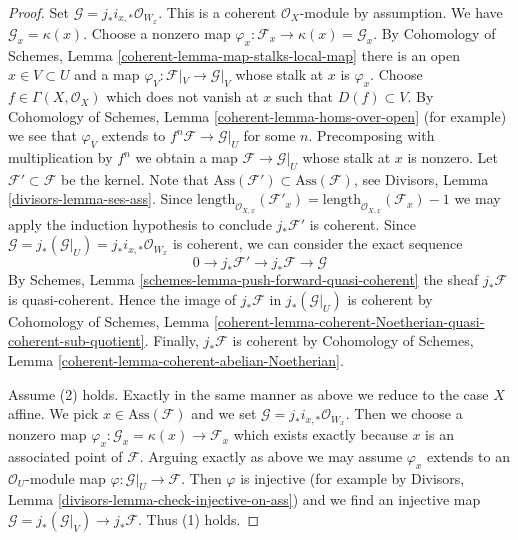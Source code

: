 \documentclass[10pt,a4paper]{amsart}
\theoremstyle{plain}
\theoremstyle{definition}
\theoremstyle{remark}
\numberwithin{equation}{subsection}
\begin{document}
\begin{proof}
\medskip\noindent
Set $\mathcal{G} = j_*i_{x, *}\mathcal{O}_{W_x}$. This is a coherent
$\mathcal{O}_X$-module by assumption. We have $\mathcal{G}_x = \kappa(x)$.
Choose a nonzero map
$\varphi_x : \mathcal{F}_x \to \kappa(x) = \mathcal{G}_x$.
By Cohomology of Schemes, Lemma \ref{coherent-lemma-map-stalks-local-map}
there is an open $x \in V \subset U$ and a map
$\varphi_V : \mathcal{F}|_V \to \mathcal{G}|_V$ whose stalk
at $x$ is $\varphi_x$. Choose $f \in \Gamma(X, \mathcal{O}_X)$
which does not vanish at $x$ such that $D(f) \subset V$. By
Cohomology of Schemes, Lemma \ref{coherent-lemma-homs-over-open}
(for example) we see that $\varphi_V$ extends to
$f^n\mathcal{F} \to \mathcal{G}|_U$ for some $n$.
Precomposing with multiplication by $f^n$ we obtain a map
$\mathcal{F} \to \mathcal{G}|_U$ whose stalk at $x$ is nonzero.
Let $\mathcal{F}' \subset \mathcal{F}$ be the kernel.
Note that $\text{Ass}(\mathcal{F}') \subset \text{Ass}(\mathcal{F})$, see
Divisors, Lemma \ref{divisors-lemma-ses-ass}.
Since
$\text{length}_{\mathcal{O}_{X, x}}(\mathcal{F}'_x) =
\text{length}_{\mathcal{O}_{X, x}}(\mathcal{F}_x) - 1$
we may apply the
induction hypothesis to conclude $j_*\mathcal{F}'$ is coherent.
Since $\mathcal{G} = j_*(\mathcal{G}|_U) = j_*i_{x, *}\mathcal{O}_{W_x}$
is coherent, we can consider the exact sequence
$$
0 \to j_*\mathcal{F}' \to j_*\mathcal{F} \to \mathcal{G}
$$
By Schemes, Lemma \ref{schemes-lemma-push-forward-quasi-coherent}
the sheaf $j_*\mathcal{F}$ is quasi-coherent.
Hence the image of $j_*\mathcal{F}$ in $j_*(\mathcal{G}|_U)$
is coherent by Cohomology of Schemes, Lemma
\ref{coherent-lemma-coherent-Noetherian-quasi-coherent-sub-quotient}.
Finally, $j_*\mathcal{F}$ is coherent by
Cohomology of Schemes, Lemma \ref{coherent-lemma-coherent-abelian-Noetherian}.

\medskip\noindent
Assume (2) holds. Exactly in the same manner as above we reduce
to the case $X$ affine. We pick $x \in \text{Ass}(\mathcal{F})$
and we set $\mathcal{G} = j_*i_{x, *}\mathcal{O}_{W_x}$.
Then we choose a nonzero map
$\varphi_x : \mathcal{G}_x = \kappa(x) \to \mathcal{F}_x$
which exists exactly because $x$ is an associated point of $\mathcal{F}$.
Arguing exactly as above we may assume $\varphi_x$
extends to an $\mathcal{O}_U$-module map
$\varphi : \mathcal{G}|_U \to \mathcal{F}$.
Then $\varphi$ is injective (for example by
Divisors, Lemma \ref{divisors-lemma-check-injective-on-ass})
and we find an injective map
$\mathcal{G} = j_*(\mathcal{G}|_V) \to j_*\mathcal{F}$.
Thus (1) holds.
\end{proof}
\end{document}
